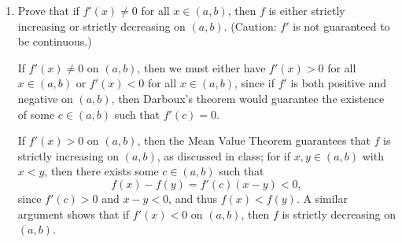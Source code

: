 \documentclass[12pt]{article}
\newcommand{\points}[1]{\marginpar{\hspace{24pt}[#1]}}
\begin{document}
\begin{enumerate}
\begin{enumerate}
\bigskip

\end{enumerate}
\item Prove that if $f'(x)\neq 0$ for all $x\in (a,b)$, then $f$ is either strictly increasing or strictly decreasing on $(a,b)$. \points{4} (Caution: $f'$ is not guaranteed to be continuous.)

\bigskip

If $f'(x)\neq 0$ on $(a,b)$, then we must either have $f'(x)>0$ for all $x\in (a,b)$ or $f'(x)<0$ for all $x\in (a,b)$, since if $f'$ is both positive and negative on $(a,b)$, then Darboux's theorem would guarantee the existence of some $c\in (a,b)$ such that $f'(c)=0$.

If $f'(x)>0$ on $(a,b)$, then the Mean Value Theorem guarantees that $f$ is strictly increasing on $(a,b)$, as discussed in class; for if $x,y\in (a,b)$ with $x<y$, then there exists some $c\in (a,b)$ such that
\[
f(x)-f(y) = f'(c)(x-y)<0,
\]
since $f'(c)>0$ and $x-y<0$, and thus $f(x)<f(y)$. A similar argument shows that if $f'(x)<0$ on $(a,b)$, then $f$ is strictly decreasing on $(a,b)$.
\end{enumerate}
\end{document}

